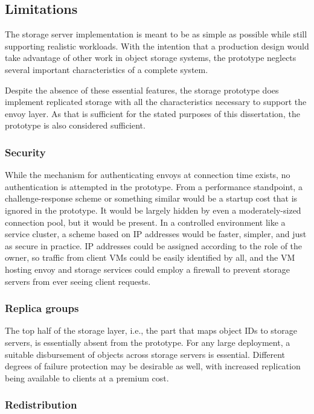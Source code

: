 \subsection{Limitations}

The storage server implementation is meant to be as simple as possible while still supporting realistic workloads. With the intention that a production design would take advantage of other work in object storage systems, the prototype neglects several important characteristics of a complete system.

Despite the absence of these essential features, the storage prototype does implement replicated storage with all the characteristics necessary to support the envoy layer. As that is sufficient for the stated purposes of this dissertation, the prototype is also considered sufficient.

\subsubsection{Security}

While the mechanism for authenticating envoys at connection time exists, no authentication is attempted in the prototype. From a performance standpoint, a challenge-response scheme or something similar would be a startup cost that is ignored in the prototype. It would be largely hidden by even a moderately-sized connection pool, but it would be present. In a controlled environment like a service cluster, a scheme based on IP addresses would be faster, simpler, and just as secure in practice. IP addresses could be assigned according to the role of the owner, so traffic from client VMs could be easily identified by all, and the VM hosting envoy and storage services could employ a firewall to prevent storage servers from ever seeing client requests.

\subsubsection{Replica groups}

The top half of the storage layer, i.e., the part that maps object IDs to storage servers, is essentially absent from the prototype. For any large deployment, a suitable disbursement of objects across storage servers is essential. Different degrees of failure protection may be desirable as well, with increased replication being available to clients at a premium cost.

\subsubsection{Redistribution}

